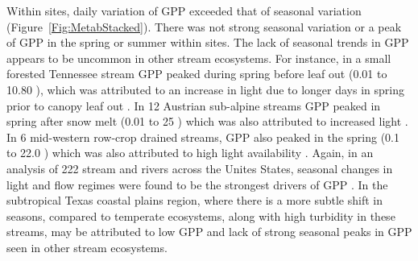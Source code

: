 Within sites, daily variation of GPP exceeded that of seasonal variation (Figure~\ref{Fig:MetabStacked}). There was not strong seasonal variation or a peak of GPP in the spring or summer within sites. The lack of seasonal trends in GPP appears to be uncommon in other stream ecosystems. For instance, in a small forested Tennessee stream GPP peaked during spring before leaf out (0.01 to 10.80 \unit{\goxy}), which was attributed to an increase in light due to longer days in spring prior to canopy leaf out \cite{roberts_multiple_2007}. In 12 Austrian sub-alpine streams GPP peaked in spring after snow melt (0.01 to 25 \unit{\goxy}) which was also attributed to increased light \cite{ulseth_climate-induced_2018}. In 6 mid-western row-crop drained streams, GPP also peaked in the spring (0.1 to 22.0 \unit{\goxy}) which was also attributed to high light availability \cite{griffithsAgriculturalLandUse2013}. Again, in an analysis of 222 stream and rivers across the Unites States, seasonal changes in light and flow regimes were found to be the strongest drivers of GPP \cite{bernhardtLightFlowRegimes2022}.  In the subtropical Texas coastal plains region, where there is a more subtle shift in seasons, compared to temperate ecosystems, along with high turbidity in these streams, may be attributed to low GPP and lack of strong seasonal peaks in GPP seen in other stream ecosystems.



